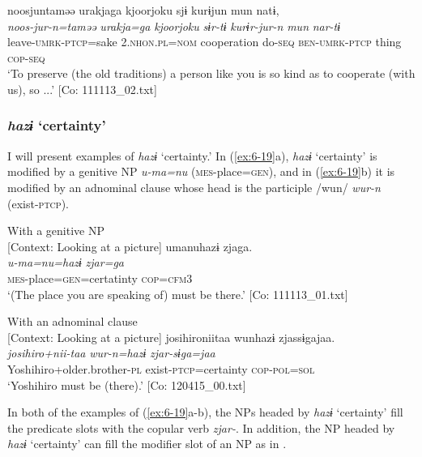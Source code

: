 {\TM}
\glll noosjuntaməə  urakjaga  {\textbar}kjoorjoku{\textbar}     sjɨ  kurɨjun  mun  natɨ,\\
     \textit{noos-jur-n=taməə}  \textit{urakja=ga}  \textit{kjoorjoku}     \textit{sɨr-tɨ}  \textit{kurɨr-jur-n}  \textit{mun}  \textit{nar-tɨ}\\
      leave-\textsc{umrk}-\textsc{ptcp}=sake  2.\textsc{nhon}.\textsc{pl}=\textsc{nom}  cooperation   do-\textsc{seq}  \textsc{ben}-\textsc{umrk}-\textsc{ptcp}  thing  \textsc{cop}-\textsc{seq}\\
\glt ‘To preserve (the old traditions) a person like you is so kind as to cooperate (with us), so ...’ [Co: 111113\_02.txt]
\z

\subsubsection{\textit{hazɨ} ‘certainty’}

I will present examples of \textit{hazɨ} ‘certainty.’ In (\ref{ex:6-19}a), \textit{hazɨ} ‘certainty’ is modified by a genitive NP \textit{u-ma=nu} (\textsc{mes}-place=\textsc{gen}), and in (\ref{ex:6-19}b) it is modified by an adnominal clause whose head is the participle /wun/ \textit{wur-n} (exist-\textsc{ptcp}).

\ea\label{ex:6-19}
\ea With a genitive NP\\{}
[Context: Looking at a picture]
{\TM}
\glll umanuhazɨ  zjaga.\\
      \textit{u-ma=nu=hazɨ}  \textit{zjar=ga}\\
      \textsc{mes}-place=\textsc{gen}=certatinty  \textsc{cop}=\textsc{cfm}3\\
\glt ‘(The place you are speaking of) must be there.’ [Co: 111113\_01.txt]
\z

\ex With an adnominal clause\\{}
[Context: Looking at a picture]
{\TM}
\glll josihironiitaa  wunhazɨ  zjassɨgajaa.\\
      \textit{josihiro+nii-taa}  \textit{wur-n=hazɨ}  \textit{zjar-sɨga=jaa}\\
      Yoshihiro+older.brother-\textsc{pl}  exist-\textsc{ptcp}=certainty  \textsc{cop}-\textsc{pol}=\textsc{sol}\\
\glt ‘Yoshihiro must be (there).’ [Co: 120415\_00.txt]
\z

In both of the examples of (\ref{ex:6-19}a-b), the NPs headed by \textit{hazɨ} ‘certainty’ fill the predicate slots with the copular verb \textit{zjar-}. In addition, the NP headed by \textit{hazɨ} ‘certainty’ can fill the modifier slot of an NP as in .


